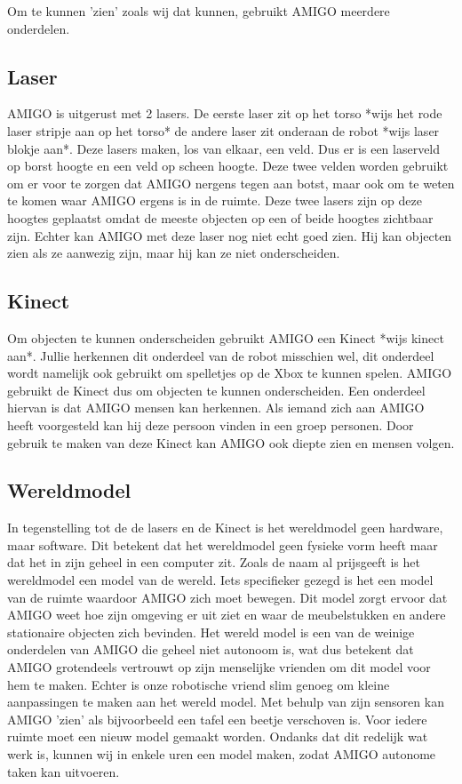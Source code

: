 \documentclass[a4paper,10pt]{article}
\numberwithin{equation}{section}
\numberwithin{figure}{section}
\numberwithin{table}{section}
\begin{document}
Om te kunnen 'zien' zoals wij dat kunnen, gebruikt AMIGO meerdere onderdelen.
\subsection*{Laser}
AMIGO is uitgerust met 2 lasers. De eerste laser zit op het torso *wijs het rode laser stripje aan op het torso* de andere laser zit onderaan de robot *wijs laser blokje aan*. Deze lasers maken, los van elkaar, een veld. Dus er is een laserveld op borst hoogte en een veld op scheen hoogte. Deze twee velden worden gebruikt om er voor te zorgen dat AMIGO nergens tegen aan botst, maar ook om te weten te komen waar AMIGO ergens is in de ruimte. Deze twee lasers zijn op deze hoogtes geplaatst omdat de meeste objecten op een of beide hoogtes zichtbaar zijn. Echter kan AMIGO met deze laser nog niet echt goed zien. Hij kan objecten zien als ze aanwezig zijn, maar hij kan ze niet onderscheiden.

\subsection*{Kinect}
Om objecten te kunnen onderscheiden gebruikt AMIGO een Kinect *wijs kinect aan*. Jullie herkennen dit onderdeel van de robot misschien wel, dit onderdeel wordt namelijk ook gebruikt om spelletjes op de Xbox te kunnen spelen. AMIGO gebruikt de Kinect dus om objecten te kunnen onderscheiden. Een onderdeel hiervan is dat AMIGO mensen kan herkennen. Als iemand zich aan AMIGO heeft voorgesteld kan hij deze persoon vinden in een groep personen. Door gebruik te maken van deze Kinect kan AMIGO ook diepte zien en mensen volgen.

\subsection*{Wereldmodel}
In tegenstelling tot de de lasers en de Kinect is het wereldmodel geen hardware, maar software. Dit betekent dat het wereldmodel geen fysieke vorm heeft maar dat het in zijn geheel in een computer zit. Zoals de naam al prijsgeeft is het wereldmodel een model van de wereld. Iets specifieker gezegd is het een model van de ruimte waardoor AMIGO zich moet bewegen. Dit model zorgt ervoor dat AMIGO weet hoe zijn omgeving er uit ziet en waar de meubelstukken en andere stationaire objecten zich bevinden. Het wereld model is een van de weinige onderdelen van AMIGO die geheel niet autonoom is, wat dus betekent dat AMIGO grotendeels vertrouwt op zijn menselijke vrienden om dit model voor hem te maken. Echter is onze robotische vriend slim genoeg om kleine aanpassingen te maken aan het wereld model. Met behulp van zijn sensoren kan AMIGO 'zien' als bijvoorbeeld een tafel een beetje verschoven is. Voor iedere ruimte moet een nieuw model gemaakt worden. Ondanks dat dit redelijk wat werk is, kunnen wij in enkele uren een model maken, zodat AMIGO autonome taken kan uitvoeren.
\end{document}
